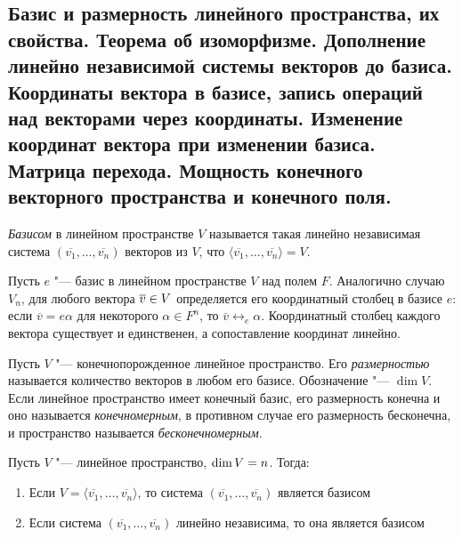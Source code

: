 \subsection{Базис и размерность линейного пространства, их свойства. Теорема об изоморфизме. Дополнение линейно независимой системы векторов до базиса. Координаты вектора в базисе, запись операций над векторами через координаты. Изменение координат вектора при изменении базиса. Матрица перехода. Мощность конечного векторного пространства и конечного поля.}

    \begin{definition}
    	\textit{Базисом} в линейном пространстве $V$ называется такая линейно независимая система $(\overline{v_1}, \dots, \overline{v_n})$ векторов из $V$, что $\langle\overline{v_1}, \dots, \overline{v_n}\rangle = V$.
    \end{definition}
    
    \begin{note}
    	Пусть $e$ "--- базис в линейном пространстве $V$ над полем $F$. Аналогично случаю $V_n$, для любого вектора $\overline{v} \hm{\in} V$ определяется его координатный столбец в базисе $e$: если $\overline{v} = e\alpha$ для некоторого $\alpha \in F^n$, то $\overline{v} \leftrightarrow_{e} \alpha$. Координатный столбец каждого вектора существует и единственен, а сопоставление координат линейно.
    \end{note}
    
    \begin{definition}
    	Пусть $V$ "--- конечнопорожденное линейное пространство. Его \textit{размерностью} называется количество векторов в любом его базисе. Обозначение "--- $\dim{V}$. Если линейное пространство имеет конечный базис, его размерность конечна и оно называется \textit{конечномерным}, в противном случае его размерность бесконечна, и пространство называется \textit{бесконечномерным}.
    \end{definition}
    
    \begin{proposition}
    	Пусть $V$ "--- линейное пространство, $\dim{V} \hm{=} n$. Тогда:
    	\begin{enumerate}
    		\item Если $V = \langle\overline{v_1}, \dots, \overline{v_n}\rangle$, то система $(\overline{v_1}, \dots, \overline{v_n})$ является базисом
    		\item Если система $(\overline{v_1}, \dots, \overline{v_n})$ линейно независима, то она является базисом
    	\end{enumerate}
    \end{proposition}
    
